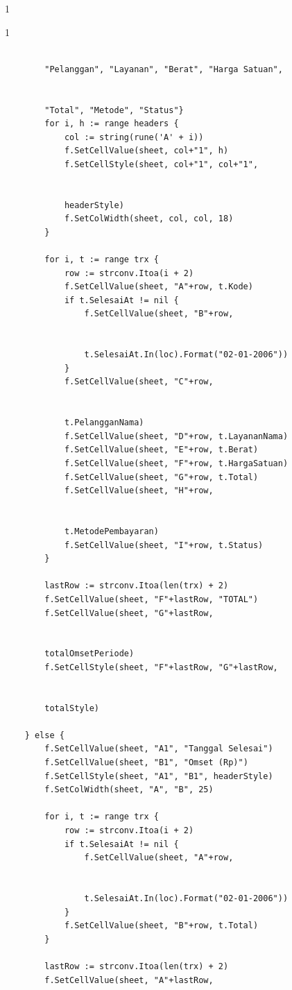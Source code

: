 \begin{enumerate}
\begin{spacing}{1}
\begin{spacing}{1}
\begin{Verbatim}[frame=single, fontsize=\small]
        
        "Pelanggan", "Layanan", "Berat", "Harga Satuan",
        
        
        "Total", "Metode", "Status"}
        for i, h := range headers {
            col := string(rune('A' + i))
            f.SetCellValue(sheet, col+"1", h)
            f.SetCellStyle(sheet, col+"1", col+"1", 
            
            
            headerStyle)
            f.SetColWidth(sheet, col, col, 18)
        }

        for i, t := range trx {
            row := strconv.Itoa(i + 2)
            f.SetCellValue(sheet, "A"+row, t.Kode)
            if t.SelesaiAt != nil {
                f.SetCellValue(sheet, "B"+row, 
                
                
                t.SelesaiAt.In(loc).Format("02-01-2006"))
            }
            f.SetCellValue(sheet, "C"+row, 
            
            
            t.PelangganNama)
            f.SetCellValue(sheet, "D"+row, t.LayananNama)
            f.SetCellValue(sheet, "E"+row, t.Berat)
            f.SetCellValue(sheet, "F"+row, t.HargaSatuan)
            f.SetCellValue(sheet, "G"+row, t.Total)
            f.SetCellValue(sheet, "H"+row, 
            
            
            t.MetodePembayaran)
            f.SetCellValue(sheet, "I"+row, t.Status)
        }

        lastRow := strconv.Itoa(len(trx) + 2)
        f.SetCellValue(sheet, "F"+lastRow, "TOTAL")
        f.SetCellValue(sheet, "G"+lastRow, 
        
        
        totalOmsetPeriode)
        f.SetCellStyle(sheet, "F"+lastRow, "G"+lastRow, 
        
        
        totalStyle)

    } else {
        f.SetCellValue(sheet, "A1", "Tanggal Selesai")
        f.SetCellValue(sheet, "B1", "Omset (Rp)")
        f.SetCellStyle(sheet, "A1", "B1", headerStyle)
        f.SetColWidth(sheet, "A", "B", 25)

        for i, t := range trx {
            row := strconv.Itoa(i + 2)
            if t.SelesaiAt != nil {
                f.SetCellValue(sheet, "A"+row, 
                
                
                t.SelesaiAt.In(loc).Format("02-01-2006"))
            }
            f.SetCellValue(sheet, "B"+row, t.Total)
        }

        lastRow := strconv.Itoa(len(trx) + 2)
        f.SetCellValue(sheet, "A"+lastRow, 
        

\end{Verbatim}
\end{spacing}
\end{spacing}
\end{enumerate}
